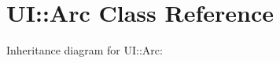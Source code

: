 \hypertarget{classUI_1_1Arc}{}\section{UI\+:\+:Arc Class Reference}
\label{classUI_1_1Arc}


Inheritance diagram for UI\+:\+:Arc\+:
